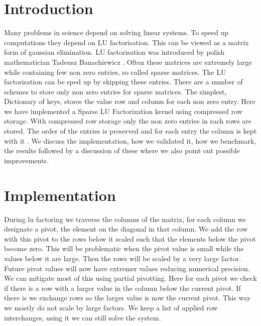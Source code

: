 \documentclass[10pt]{article}
\author{David Kleingeld, s1432982}
\title{}
\begin{document}

\maketitle

\section{Introduction}
Many problems in science depend on solving linear systems. To speed up computations they depend on LU factorisation. This can be viewed as a matrix form of gaussian elimination. LU factorisation was introduced by polish mathematician Tadeusz Banachiewicz \cite{lu}.
Often these matrices are extremely large while containing few non zero entries, so called sparse matrices. The LU factorisation can be sped up by skipping these entries. There are a number of schemes to store only non zero entries for sparse matrices. The simplest, Dictionary of keys, stores the value row and column for each non zero entry. Here we have implemented a Sparse LU Factorization kernel using compressed row storage. With compressed row storage only the non zero entries in each rows are stored. The order of the entries is preserved and for each entry the column is kept with it \cite{compressedRowStorage}. We discuss the implementation, how we validated it, how we benchmark, the results followed by a discussion of these where we also point out possible improvements. 

\section{Implementation}

During lu factoring we traverse the columns of the matrix, for each column we designate a pivot, the element on the diagonal in that column. We add the row with this pivot to the rows below it scaled such that the elements below the pivot become zero. This will be problematic when the pivot value is small while the values below it are large. Then the rows will be scaled by a very large factor. Future pivot values will now have extremer values reducing numerical precision. 
We can mitigate most of this using partial pivotting. Here for each pivot we check if there is a row with a larger value in the column below the current pivot. If there is we exchange rows so the larger value is now the current pivot. This way we mostly do not scale by large factors. We keep a list of applied row interchanges, using it we can still solve the system.
\end{document}
